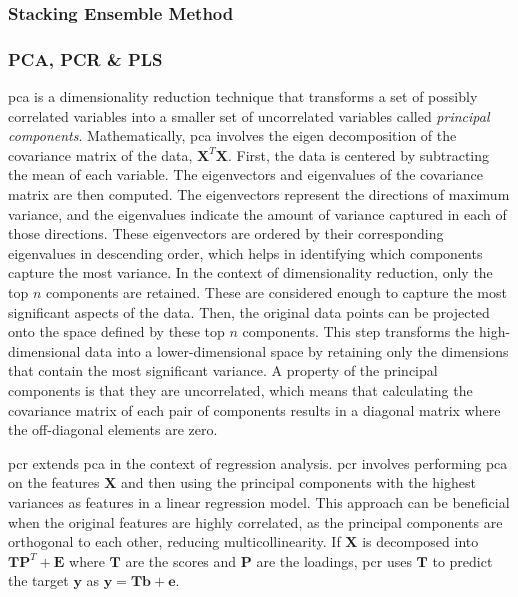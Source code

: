 \subsubsection{Stacking Ensemble Method}

\subsubsection{PCA, PCR \& PLS}
\gls{pca} is a dimensionality reduction technique that transforms a set of possibly correlated variables into a smaller set of uncorrelated variables called \textit{principal components}.
Mathematically, \gls{pca} involves the eigen decomposition of the covariance matrix of the data, $\mathbf{X}^T \mathbf{X}$.
First, the data is centered by subtracting the mean of each variable.
The eigenvectors and eigenvalues of the covariance matrix are then computed.
The eigenvectors represent the directions of maximum variance, and the eigenvalues indicate the amount of variance captured in each of those directions.
These eigenvectors are ordered by their corresponding eigenvalues in descending order, which helps in identifying which components capture the most variance.
In the context of dimensionality reduction, only the top $n$ components are retained.
These are considered enough to capture the most significant aspects of the data.
Then, the original data points can be projected onto the space defined by these top $n$ components.
This step transforms the high-dimensional data into a lower-dimensional space by retaining only the dimensions that contain the most significant variance.
A property of the principal components is that they are uncorrelated, which means that calculating the covariance matrix of each pair of components results in a diagonal matrix where the off-diagonal elements are zero.

\gls{pcr} extends \gls{pca} in the context of regression analysis.
\gls{pcr} involves performing \gls{pca} on the features $\mathbf{X}$ and then using the principal components with the highest variances as features in a linear regression model.
This approach can be beneficial when the original features are highly correlated, as the principal components are orthogonal to each other, reducing multicollinearity.
If $\mathbf{X}$ is decomposed into $\mathbf{TP}^T + \mathbf{E}$ where $\mathbf{T}$ are the scores and $\mathbf{P}$ are the loadings, \gls{pcr} uses $\mathbf{T}$ to predict the target $\mathbf{y}$ as $\mathbf{y} = \mathbf{Tb} + \mathbf{e}$.

